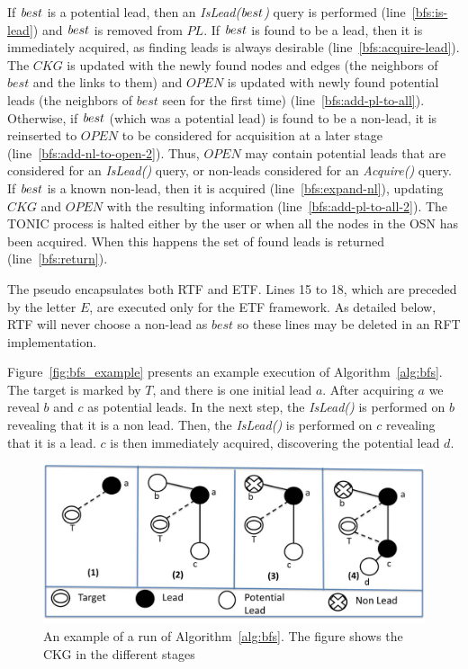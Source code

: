 \documentclass[prodmode,acmtecs]{acmsmall} %
\newcommand{\note}[2]{\textbf{\textsc{#1} says: \textit{#2}}}
\newcommand{\islead}[1]{{\em IsLead(#1)}}
\newcommand{\acquire}[1]{{\em Acquire(#1)}}
\newcommand{\best}{{\textit best}}
\begin{document}
If $\best$ is a potential lead, then an \islead{$\best$} query is performed (line~\ref{bfs:is-lead}) and $\best$ is removed from $PL$.
If $\best$ is found to be a lead, then it is immediately acquired, as finding leads is always desirable (line~\ref{bfs:acquire-lead}). The $CKG$ is updated with the newly found nodes and edges (the neighbors of $best$ and the links to them) and $OPEN$ is updated with newly found potential leads (the neighbors of $best$ seen for the first time) (line~\ref{bfs:add-pl-to-all}).
Otherwise, if $\best$ (which was a potential lead) is found to be a non-lead, it is reinserted to $OPEN$ to be considered for acquisition at a later stage (line~\ref{bfs:add-nl-to-open-2}).
Thus, $OPEN$ may contain potential leads that are considered for an \islead{} query, or non-leads considered for an \acquire{} query. 
If $\best$ is a known non-lead, then it is acquired (line~\ref{bfs:expand-nl}), updating $CKG$ and $OPEN$ with the resulting information (line~\ref{bfs:add-pl-to-all-2}).
The TONIC process is halted either by the user  or when all the nodes in the OSN has been acquired. When this happens the set of found leads is returned (line~\ref{bfs:return}). 


The pseudo encapsulates both RTF and ETF. Lines 15 to 18, which are preceded by the letter $E$, are executed only for the ETF framework. As detailed below, RTF will never choose a non-lead as $best$ so these lines may be deleted in an RFT implementation.




Figure~\ref{fig:bfs_example} presents an example execution of Algorithm~\ref{alg:bfs}.
The target is marked by $T$, and there is one initial lead $a$. %
After acquiring $a$ we reveal $b$ and $c$ as potential leads.
In the next step, the \islead{} is performed on $b$ revealing that it is a non lead.
Then, the \islead{} is performed on $c$ revealing that it is a lead. $c$ is then immediately acquired,  discovering the potential lead $d$.




\begin{figure}[t!]
  \centering
	 \includegraphics[width=0.8\linewidth]{btf-process-and-legend-new.jpg}
  \caption{An example of a run of Algorithm~\ref{alg:bfs}. The figure shows the CKG in the different stages}
	\label{fig:bfs_example}\label{fig:basic_fifo}
\end{figure}
\end{document}
